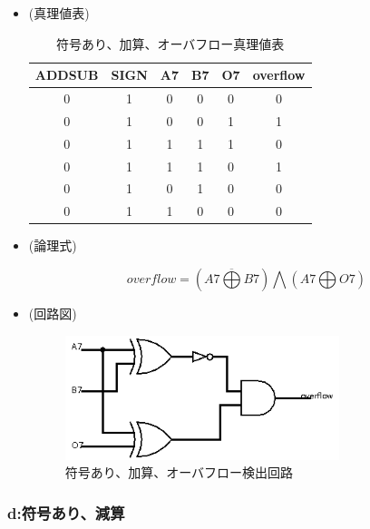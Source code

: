 \documentclass[11pt,a4j]{jsarticle}
\begin{document}
    \begin{itemize}
    
    \item (真理値表)
    
    \begin{table}[htb]
  \begin{center}
    \caption{符号あり、加算、オーバフロー真理値表}
    \begin{tabular}{ccccc|c} \toprule
ADDSUB & SIGN & A7 & B7 & O7 & overflow \\ \midrule
0 & 1 & 0 & 0 & 0 & 0 \\
0 & 1 & 0 & 0 & 1 & 1 \\
0 & 1 & 1 & 1 & 1 & 0 \\
0 & 1 & 1 & 1 & 0 & 1 \\
0 & 1 & 0 & 1 & 0 & 0 \\
0 & 1 & 1 & 0 & 0 & 0 \\ \bottomrule
    \end{tabular}
    \label{}
  \end{center}
 \end{table}
    
    \item (論理式)
    
    \begin{equation}
    overflow = (\overline{A7 \bigoplus B7}) \bigwedge (A7 \bigoplus O7)
    \end{equation}
    
    \item (回路図)
    
    \begin{figure}[htbp]
  \centering
  \includegraphics[width=8cm,clip]{3-c.png}
  \caption{符号あり、加算、オーバフロー検出回路}
  \label{fig:3-c}
 \end{figure}
    
    \end{itemize}
    
    \clearpage
    
    \subsubsection{d:符号あり、減算}
    
\end{document}
